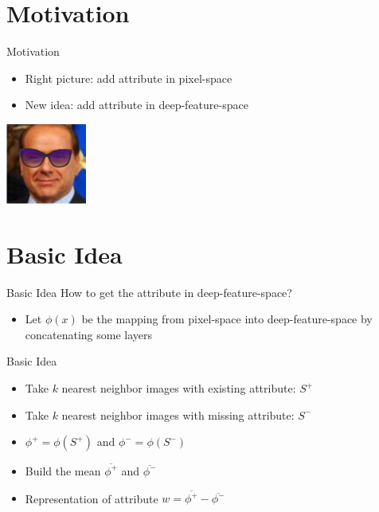 \documentclass[11pt]{beamer}
\begin{document}
\addtocounter{framenumber}{-1} %




\begin{frame}[allowframebreaks]
	\tableofcontents
\end{frame}%

\section{Motivation}

\begin{frame}{Motivation}
		\begin{minipage}{.5\textwidth}
			\centering
			\begin{itemize}
				\item<1-> Right picture: add attribute in pixel-space
				\item<2-> New idea: add attribute in deep-feature-space
			\end{itemize}
		\end{minipage}%
		\begin{minipage}{.5\textwidth}
			\centering
			\includegraphics[width=100px]{../pictures/Berlusconi.png}		
		\end{minipage}
\end{frame}

\section{Basic Idea}

\begin{frame}{Basic Idea}
	How to get the attribute in deep-feature-space?
	\begin{itemize}
		\item Let $\phi(x)$ be the mapping from pixel-space into deep-feature-space by concatenating some layers
		\begin{center}
				
		\end{center}
	\end{itemize}
\end{frame}

\begin{frame}{Basic Idea}
	\begin{itemize}
		\item Take $k$ nearest neighbor images with existing attribute: $S^+$
		\item Take $k$ nearest neighbor images with missing attribute: $S^-$
		\item $\phi^+ = \phi(S^+)$ and $\phi^- = \phi(S^-)$
		\item Build the mean $\overline{\phi^+}$ and $\overline{\phi^-}$
		\item Representation of attribute $w=\overline{\phi^+}-\overline{\phi^-}$
	\end{itemize}
\end{frame}
\end{document}
